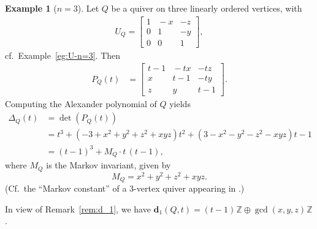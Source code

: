 \documentclass[11pt, letterpaper]{amsart}
\theoremstyle{definition}
\newtheorem{example}[theorem]{Example}
\numberwithin{equation}{section}
\def\ZZ{{\mathbb Z}}
\def\dd{{\mathbf{d}}}
\begin{document}
\begin{example}[$n=3$]
\label{eg:3vert-inv}
Let $Q$ be a quiver on three linearly ordered vertices, with 
\begin{align*}
U_Q=\begin{bmatrix} 
1 &  \! \!-x \! \! & -z \\
0 &  \! \!1 \! \! & -y \\
0 &  \! \!0 \! \! & 1
\end{bmatrix}, 
\end{align*}
cf.\ Example~\ref{eg:U-n=3}. 
Then 
\begin{align*}
P_Q(t)&=\begin{bmatrix} 
t-1 &  \! \!-tx \! \! & -tz \\
x &  \! \!t-1 \! \! & -ty \\
z &  \! \!y \! \! & t-1
\end{bmatrix}. 
\end{align*}
%
Computing the Alexander polynomial of $Q$ yields 
\begin{align}
\nonumber
\Delta_Q(t)&=\det(P_Q(t)) \\
\nonumber
&=t^3 + (-3 \!+\!x^2 \!+\! y^2 \!+\! z^2 \!+\!xyz)t^2 + (3\! -\!x^2 \!-\!y^2\! -\!z^2 \!-\!xyz)t - 1 \\
\label{eq:alex-n=3}
&=(t-1)^3 + M_Q\cdot t\,(t-1), 
\end{align}
%
where $M_Q$ is the Markov invariant, given by 
\begin{equation}
\label{eq:markov-n=3}
M_Q %
=x^2 + y^2 + z^2 +xyz .
\end{equation}
(Cf.\ the ``Markov constant'' of a 3-vertex quiver appearing in  \cite[Section~3]{BBH}.) 



In view of Remark~\ref{rem:d_1}, we have $\dd_1(Q,t)=(t-1)\hspace{1pt}\ZZ\oplus \gcd(x,y,z)\hspace{1pt}\ZZ$. 


\end{example}
\end{document}
